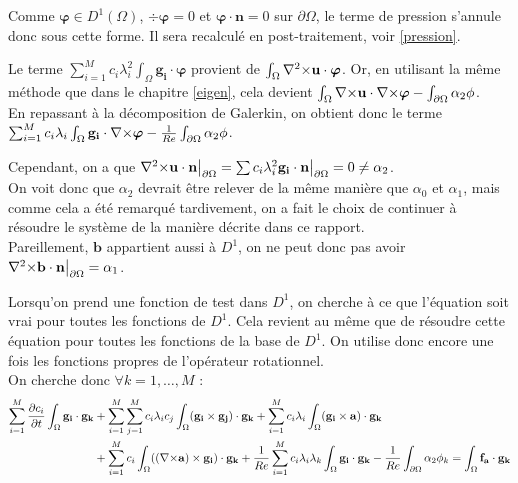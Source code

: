 \begin{rk}
Comme $\bm{\varphi}\in D^1(\Omega)$, $\div\bm{\varphi}=0$ et $\bm{\varphi}\cdot \mathbf{n}=0$ sur $\partial\Omega$, le terme de pression s'annule donc sous cette forme. Il sera recalculé en post-traitement, voir \ref{pression}.\\
\end{rk}
Le terme $\sum_{i=1}^Mc_i\lambda_i^2\int_\Omega\mathbf{g_i}\cdot\bm{\varphi}$ provient de $\int_\Omega {\nabla^2\times}\mathbf{u}\cdot\bm{\varphi}$. Or, en utilisant la même méthode que dans le chapitre \ref{eigen}, cela devient $\int_\Omega{\nabla\times}\mathbf{u}\cdot{\nabla\times}\bm{\varphi} -\int_{\partial\Omega} \alpha_2\phi$.\\
En repassant à la décomposition de Galerkin, on obtient donc le terme $\sum_{i=1}^Mc_i\lambda_i\int_\Omega\mathbf{g_i}\cdot{\nabla\times}\bm{\varphi}-\frac{1}{Re}\int_{\partial\Omega} \alpha_2\phi$.\\
\begin{rk}
Cependant, on a que ${\nabla^2\times}\mathbf{u}\cdot\mathbf{n}{\big\rvert_{\partial\Omega}}=\sum c_i\lambda_i^2 \mathbf{g_i}\cdot\mathbf{n}{\big\rvert_{\partial\Omega}} = 0 \neq\alpha_2$.\\
On voit donc que $\alpha_2$ devrait être relever de la même manière que $\alpha_0$ et $\alpha_1$, mais comme cela a été remarqué tardivement, on a fait le choix de continuer à résoudre le système de la manière décrite dans ce rapport.\\
Pareillement, $\mathbf{b}$ appartient aussi à $D^1$, on ne peut donc pas avoir ${\nabla^2\times}\mathbf{b}\cdot\mathbf{n}{\big\rvert_{\partial\Omega}}=\alpha_1$.
\end{rk}
Lorsqu'on prend une fonction de test dans $D^1$, on cherche à ce que l'équation soit vrai pour toutes les fonctions de $D^1$. Cela revient au même que de résoudre cette équation pour toutes les fonctions de la base de $D^1$. On utilise donc encore une fois les fonctions propres de l'opérateur rotationnel.\\
On cherche donc $\forall k=1,\dots,M$ :
\begin{align*}
\sum_{i=1}^M\frac{\partial c_i}{\partial t}\int_\Omega\mathbf{g_i}\cdot\mathbf{g_k} &+ \sum_{i=1}^M\sum_{j=1}^Mc_i\lambda_ic_j\int_\Omega(\mathbf{g_i}\times \mathbf{g_j})\cdot\mathbf{g_k} + \sum_{i=1}^Mc_i\lambda_i\int_\Omega(\mathbf{g_i}\times \mathbf{a})\cdot\mathbf{g_k}\\
& +  \sum_{i=1}^Mc_i\int_\Omega(({\nabla\times}\mathbf{a})\times \mathbf{g_i})\cdot\mathbf{g_k} +\frac{1}{Re}\sum_{i=1}^Mc_i\lambda_i\lambda_k\int_\Omega\mathbf{g_i}\cdot\mathbf{g_k}-\frac{1}{Re}\int_{\partial\Omega} \alpha_2\phi_k = \int_\Omega\mathbf{f_a}\cdot\mathbf{g_k}\\
\end{align*}
